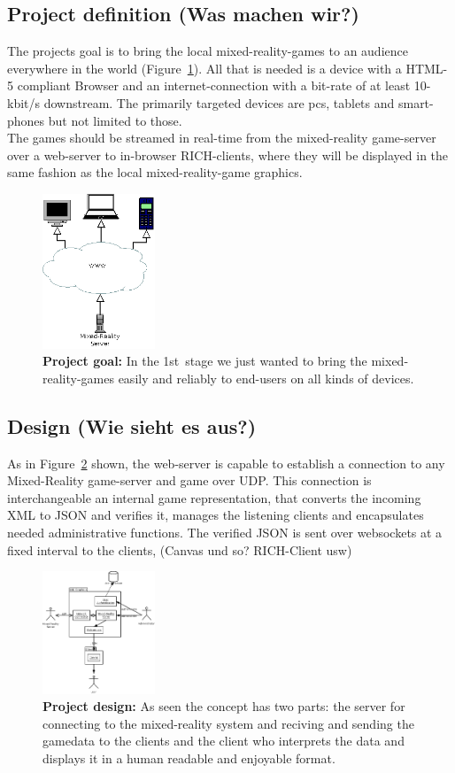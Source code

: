 \documentclass[journal]{IEEEtran}
\begin{document}
\subsection{Project definition (Was machen wir?)}
The projects goal is to bring the local mixed-reality-games to an audience everywhere in the world (Figure~\ref{fig:proj_goal}). All that is needed is a device with a HTML-5 compliant Browser and an internet-connection with a bit-rate of at least 10-kbit/s downstream.
The primarily targeted devices are pcs, tablets and smart-phones but not limited to those.\\
The games should be streamed in real-time from the mixed-reality game-server over a web-server to in-browser RICH-clients, where they will be displayed in the same fashion as the local mixed-reality-game graphics.
\begin{figure}[!t]
    \centering
    \includegraphics[width=0.3\textwidth]{project-target.png}
    \caption{\textbf{Project goal:} In the 1st~stage we just wanted to bring the mixed-reality-games easily and reliably to end-users on all kinds of devices.}
    \label{fig:proj_goal}
\end{figure}
\subsection{Design (Wie sieht es aus?)}
As in Figure~\ref{fig:proj_design} shown, the web-server is capable to establish a connection to any Mixed-Reality game-server and game over UDP. This connection is interchangeable an internal game representation, that converts the incoming XML to JSON and verifies it, manages the listening clients and encapsulates needed administrative functions. The verified JSON is sent over websockets at a fixed interval to the clients, (Canvas und so? RICH-Client usw)
\begin{figure}[!t]
    \centering
    \includegraphics[width=0.3\textwidth]{design.png}
    \caption{\textbf{Project design:} As seen the concept has two parts: the server for connecting to the mixed-reality system and reciving and sending the gamedata to the clients and the client who interprets the data and displays it in a human readable and enjoyable format.}
    \label{fig:proj_design}
\end{figure}
\end{document}
